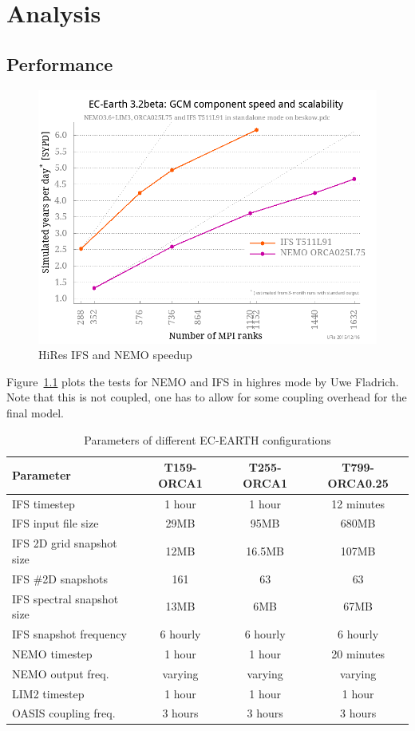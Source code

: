 
\chapter{Analysis}

\section{Performance}

\begin{figure}[h!]
    \centering
    \includegraphics[scale=0.4]{figs/ece32b-speedup}
    \caption{HiRes IFS and NEMO speedup}
    \label{fig:hires-speed}
\end{figure}

Figure~\ref{fig:hires-speed} plots the tests for NEMO and IFS in highres mode by Uwe Fladrich. Note that
this is not coupled, one has to allow for some coupling overhead for the final model.

\begin{table}
\begin{tabular}{|l|c|c|c|}
    \hline
    Parameter& T159-ORCA1& T255-ORCA1& T799-ORCA0.25\\
    \hline
    IFS timestep& 1 hour& 1 hour& 12 minutes\\
    IFS input file size& 29MB& 95MB& 680MB\\
    IFS 2D grid snapshot size& 12MB& 16.5MB& 107MB\\
    IFS \#2D snapshots& 161& 63& 63\\
    IFS spectral snapshot size& 13MB& 6MB& 67MB\\
    IFS snapshot frequency& 6 hourly& 6 hourly& 6 hourly\\
    NEMO timestep& 1 hour& 1 hour& 20 minutes\\
    NEMO output freq.& varying& varying& varying\\
    LIM2 timestep& 1 hour& 1 hour& 1 hour\\
    OASIS coupling freq.& 3 hours& 3 hours& 3 hours    \\
    \hline 
\end{tabular}
\caption{Parameters of different EC-EARTH configurations}%
\end{table}

